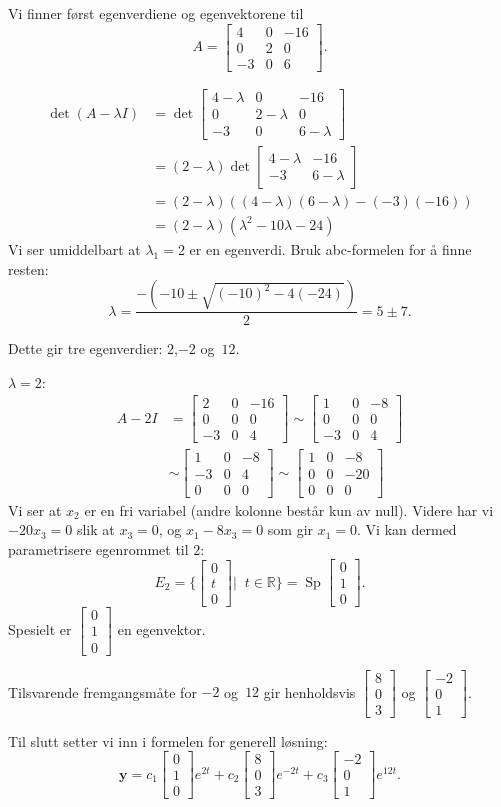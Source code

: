 \documentclass[titlepage,a4paper,12pt,norsk]{IMFeksamen}
\DeclareMathOperator{\Sp}{Sp}
\newcommand{\V}[1]{\mathbf{#1}}
\newcommand{\vvv}[3]{\begin{bmatrix} #1 \\ #2 \\ #3 \end{bmatrix}}
\newcommand{\0}{\V{0}}
\begin{document}
\begin{oppgave}
Vi finner først egenverdiene og egenvektorene til
\[A=
\begin{bmatrix}
4 & 0 & -16 \\
0 & 2 & 0 \\
-3 & 0 & 6
\end{bmatrix}.
\]

\begin{align*}
\det (A-\lambda I) &= \det
\begin{bmatrix}
4-\lambda & 0 & -16 \\
0 & 2-\lambda & 0 \\
-3 & 0 & 6-\lambda
\end{bmatrix}\\
&= (2-\lambda)\det
\begin{bmatrix}
4-\lambda & -16 \\
-3 &  6-\lambda
\end{bmatrix}\\
&=(2-\lambda)((4-\lambda)(6-\lambda)-(-3)(-16))\\
&=(2-\lambda)(\lambda ^2-10\lambda-24)
\end{align*}
Vi ser umiddelbart at $\lambda_1=2$ er en egenverdi. Bruk abc-formelen for å finne resten:
$$\lambda=\frac{-(-10\pm \sqrt{(-10)^2-4(-24)})}{2}=5\pm 7.$$

Dette gir tre egenverdier: $2$,$-2$ og~$12$.

\noindent 
$\lambda=2$:
\begin{align*}
A-2I &=
\begin{bmatrix}
2 & 0 & -16 \\
0 & 0 & 0 \\
-3 & 0 & 4
\end{bmatrix}
\sim
\begin{bmatrix}
1 & 0 & -8 \\
0 & 0 & 0 \\
-3 & 0 & 4
\end{bmatrix}\\
&\sim
\begin{bmatrix}
1 & 0 & -8 \\
-3 & 0 & 4 \\
0 & 0 & 0
\end{bmatrix}
\sim
\begin{bmatrix}
1 & 0 & -8 \\
0 & 0 & -20 \\
0 & 0 & 0
\end{bmatrix}
\end{align*}
Vi ser at $x_2$ er en fri variabel (andre kolonne består kun av null). Videre har vi $-20x_3=0$ slik at $x_3=0$, og $x_1-8x_3=0$ som gir $x_1=0$. Vi kan dermed parametrisere egenrommet til $2$:
$$E_2=\{\vvv{0}{t}{0}|\;\;t\in\mathbb{R}\}=\Sp \vvv{0}{1}{0}.$$ Spesielt er $\vvv{0}{1}{0}$ en egenvektor.

\noindent
Tilsvarende fremgangsmåte for $-2$ og~$12$ gir henholdsvis $\vvv{8}{0}{3}$ og $\vvv{-2}{0}{1}$.


\noindent
Til slutt setter vi inn i formelen for generell løsning:
$$\V{y} = c_1\vvv{0}{1}{0}e^{2t}+c_2\vvv{8}{0}{3}e^{-2t}+c_3 \vvv{-2}{0}{1}e^{12t}.$$
\end{oppgave}
\end{document}

